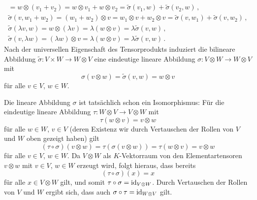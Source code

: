 \begin{example}
\begin{itemize}
\begin{gather*}
        = w \otimes (v_1 + v_2)
        = w \otimes v_1 + w \otimes v_2
        = \tilde{\sigma}(v_1, w) + \tilde{\sigma}(v_2, w) \,,
        \\
          \tilde{\sigma}(v, w_1 + w_2)
        = (w_1 + w_2) \otimes v
        = w_1 \otimes v + w_2 \otimes v
        = \tilde{\sigma}(v, w_1) + \tilde{\sigma}(v, w_2) \,,
        \\
          \tilde{\sigma}(\lambda v, w)
        = w \otimes (\lambda v)
        = \lambda (w \otimes v)
        = \lambda \tilde{\sigma}(v, w) \,,
        \\
          \tilde{\sigma}(v, \lambda w)
        = (\lambda w) \otimes v
        = \lambda (w \otimes v)
        = \lambda \tilde{\sigma}(v, w) \,.
      \end{gather*}
      Nach der universellen Eigenschaft des Tensorprodukts induziert die bilineare Abbildung $\tilde{\sigma} \colon V \times W \to W \otimes V$ eine eindeutige lineare Abbildung $\sigma \colon V \otimes W \to W \otimes V$ mit
      \[
          \sigma(v \otimes w)
        = \tilde{\sigma}(v, w)
        = w \otimes v
      \]
      für alle $v \in V$, $w \in W$.
      
      Die lineare Abbildung $\sigma$ ist tatsächlich schon ein Isomorphismus:
      Für die eindeutige lineare Abbildung $\tau \colon W \otimes V \to V \otimes W$ mit
      \[
          \tau(w \otimes v)
        = v \otimes w
      \]
      für alle $w \in W$, $v \in V$ (deren Existenz wir durch Vertauschen der Rollen von $V$ und $W$ oben gezeigt haben) gilt
      \[
          (\tau \circ \sigma)(v \otimes w)
        = \tau(\sigma(v \otimes w))
        = \tau(w \otimes v)
        = v \otimes w
      \]
      für alle $v \in V$, $w \in W$.
      Da $V \otimes W$ als $K$-Vektorraum von den Elementartensoren $v \otimes w$ mit $v \in V$, $w \in W$ erzeugt wird, folgt hieraus, dass bereits
      \[
          (\tau \circ \sigma)(x)
        = x
      \]
      für alle $x \in V \otimes W$ gilt, und somit $\tau \circ \sigma = \operatorname{id}_{V \otimes W}$.
      Durch Vertauschen der Rollen von $V$ und $W$ ergibt sich, dass auch $\sigma \circ \tau = \operatorname{id}_{W \otimes V}$ gilt.
  \end{itemize}
\end{example}

